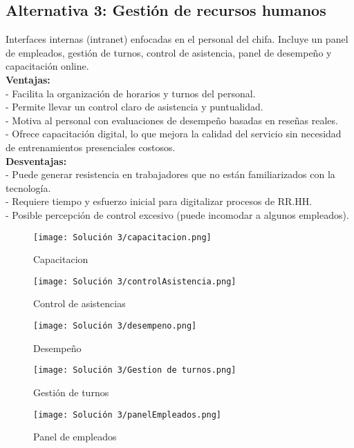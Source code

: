 \documentclass{article}
\begin{document}
\begin{doublespace}
    \subsection{Alternativa 3: Gestión de recursos humanos}

    \noindent Interfaces internas (intranet) enfocadas en el personal del chifa. Incluye un panel de empleados, gestión de turnos, control de asistencia, panel de desempeño y capacitación online.\\
    \textbf{Ventajas:}\\
    - Facilita la organización de horarios y turnos del personal.\\
    - Permite llevar un control claro de asistencia y puntualidad.\\
    - Motiva al personal con evaluaciones de desempeño basadas en reseñas reales.\\
    - Ofrece capacitación digital, lo que mejora la calidad del servicio sin necesidad de entrenamientos presenciales costosos.
    \\
    \textbf{Desventajas:}\\
    - Puede generar resistencia en trabajadores que no están familiarizados con la tecnología.\\
    - Requiere tiempo y esfuerzo inicial para digitalizar procesos de RR.HH.\\
    - Posible percepción de control excesivo (puede incomodar a algunos empleados).\\

    \begin{figure}[H]
        \centering
        \vspace*{1cm}
        \texttt{[image: Solución 3/capacitacion.png]}
        \caption{Capacitacion}
        \label{fig:Capacitacion}
    \end{figure}
    \begin{figure}[H]
        \centering
        \vspace*{1cm}
        \texttt{[image: Solución 3/controlAsistencia.png]}
        \caption{Control de asistencias}
        \label{fig:Control-de-asistencias}
    \end{figure}
    \begin{figure}[H]
        \centering
        \vspace*{1cm}
        \texttt{[image: Solución 3/desempeno.png]}
        \caption{Desempeño}
        \label{fig:Desempeno}
    \end{figure}
    \begin{figure}[H]
        \centering
        \vspace*{1cm}
        \texttt{[image: Solución 3/Gestion de turnos.png]}
        \caption{Gestión de turnos}
        \label{fig:Gestion-de-turnos}
    \end{figure}
    \begin{figure}[H]
        \centering
        \vspace*{1cm}
        \texttt{[image: Solución 3/panelEmpleados.png]}
        \caption{Panel de empleados}
        \label{fig:Panel-de-empleados}
    \end{figure}


\end{doublespace}
\end{document}

